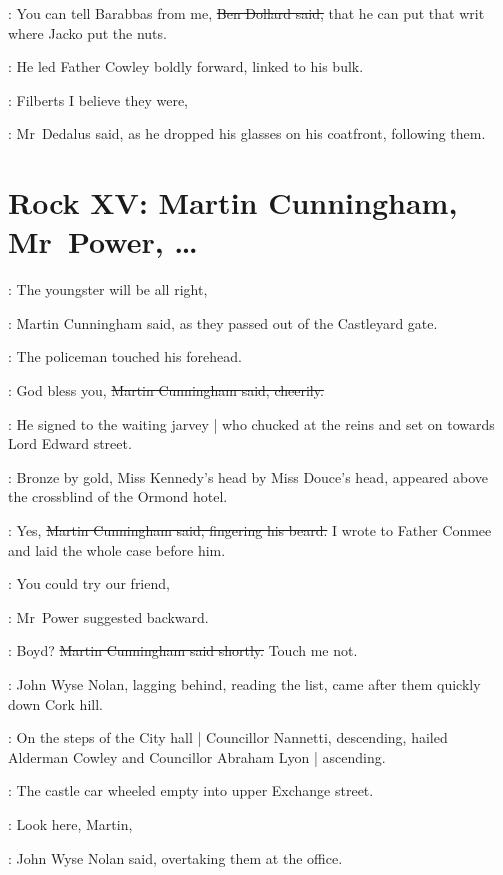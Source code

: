 \dollard:
You can tell Barabbas from me,
\sout{Ben Dollard said,}%
that he can put that writ where Jacko put the nuts.

:
He led Father Cowley boldly forward,
linked to his bulk.

\simon:
Filberts I believe they were,

:
Mr~Dedalus said,
as he dropped his
glasses on his coatfront,
following them.


\section*{Rock XV: Martin Cunningham, Mr~Power, \ldots}


\cunningham:
The youngster will be all right,

:
Martin Cunningham said,
as they passed
out of the Castleyard gate.

:
The policeman touched his forehead.

\cunningham:
God bless you,
\sout{Martin Cunningham said, cheerily.}

:
He signed to the waiting jarvey |
who chucked at the reins
and set on towards Lord Edward street.

\begin{interject}
    :
    Bronze by gold,
    Miss Kennedy's head by Miss Douce's head,
    appeared above
    the crossblind of the Ormond hotel.
\end{interject}

\cunningham:
Yes,
\sout{Martin Cunningham said,
fingering his beard.}
I wrote to Father Conmee and laid the whole case before him.

\power:
You could try our friend,

:
Mr~Power suggested backward.

\cunningham:
Boyd?
\sout{Martin Cunningham said shortly.}
Touch me not.

:
John Wyse Nolan,
lagging behind, reading the list,
came after them
quickly down Cork hill.

:
On the steps of the City hall |
Councillor Nannetti, descending,
hailed Alderman Cowley and Councillor Abraham Lyon |
ascending.

:
The castle car wheeled empty into upper Exchange street.

\johnwyse:
Look here, Martin,

:
John Wyse Nolan said,
overtaking them at the  office.

